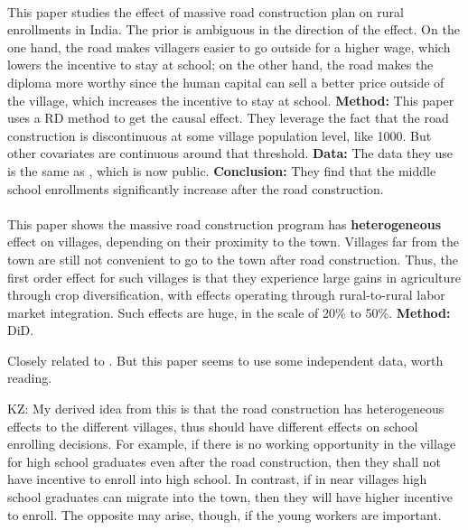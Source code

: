 \paragraph{\citet{AdukiaAsherNovosad2019}}

This paper studies the effect of massive road construction plan on rural enrollments in India.
The prior is ambiguous in the direction of the effect.
On the one hand, the road makes villagers easier to go outside for a higher wage, which lowers the incentive to stay at school;
on the other hand, the road makes the diploma more worthy since the human capital can sell a better price outside of the village, which increases the incentive to stay at school.
\textbf{Method:}
This paper uses a RD method to get the causal effect.
They leverage the fact that the road construction is discontinuous at some village population level, like 1000. But other covariates are continuous around that threshold.
\textbf{Data:}
The data they use is the same as \citet{AsherNovosad2019}, which is now public.
\textbf{Conclusion:}
They find that the middle school enrollments significantly increase after the road construction.


\paragraph{\citet{Shamdasani2019}}

This paper shows the massive road construction program has \textbf{heterogeneous} effect on villages, depending on their proximity to the town. 
Villages far from the town are still not convenient to go to the town after road construction. 
Thus, the first order effect for such villages is that they experience large gains in agriculture through crop diversification, with effects operating through rural-to-rural labor market integration.
Such effects are huge, in the scale of 20\% to 50\%.
\textbf{Method:} DiD.

Closely related to \citet{AsherNovosad2019}.
But this paper seems to use some independent data, worth reading.

KZ: My derived idea from this is that the road construction has heterogeneous effects to the different villages, thus should have different effects on school enrolling decisions.
For example, if there is no working opportunity in the village for high school graduates even after the road construction, then they shall not have incentive to enroll into high school.
In contrast, if in near villages high school graduates can migrate into the town, then they will have higher incentive to enroll.
The opposite may arise, though, if the young workers are important.

